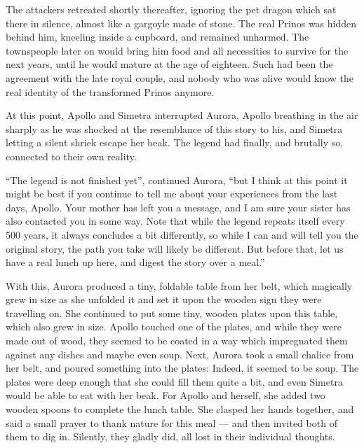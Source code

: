 The attackers retreated shortly thereafter, ignoring the pet dragon which sat there in silence, almost like a gargoyle made of stone. The real Prinos was hidden behind him, kneeling inside a cupboard, and remained unharmed. The townspeople later on would bring him food and all necessities to survive for the next years, until he would mature at the age of eighteen. Such had been the agreement with the late royal couple, and nobody who was alive would know the real identity of the transformed Prinos anymore.

\fancybreaker{}

At this point, Apollo and Simetra interrupted Aurora, Apollo breathing in the air sharply as he was shocked at the resemblance of this story to his, and Simetra letting a silent shriek escape her beak. The legend had finally, and brutally so, connected to their own reality.

\enquote{The legend is not finished yet}, continued Aurora, \enquote{but I think at this point it might be best if you continue to tell me about your experiences from the last days, Apollo. Your mother has left you a message, and I am sure your sister has also contacted you in some way. Note that while the legend repeats itself every 500 years, it always concludes a bit differently, so while I can and will tell you the original story, the path you take will likely be different. But before that, let us have a real lunch up here, and digest the story over a meal.}

With this, Aurora produced a tiny, foldable table from her belt, which magically grew in size as she unfolded it and set it upon the wooden sign they were travelling on. She continued to put some tiny, wooden plates upon this table, which also grew in size. Apollo touched one of the plates, and while they were made out of wood, they seemed to be coated in a way which impregnated them against any dishes and maybe even soup. Next, Aurora took a small chalice from her belt, and poured something into the plates: Indeed, it seemed to be soup. The plates were deep enough that she could fill them quite a bit, and even Simetra would be able to eat with her beak. For Apollo and herself, she added two wooden spoons to complete the lunch table. She clasped her hands together, and said a small prayer to thank nature for this meal --- and then invited both of them to dig in. Silently, they gladly did, all lost in their individual thoughts.
